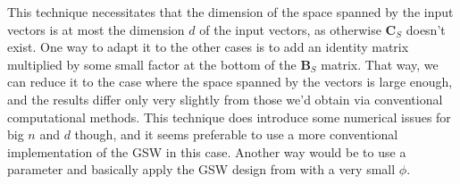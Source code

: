 \documentclass[12pt]{article}
\begin{document}
This technique necessitates that the dimension of the space spanned by the input vectors is at most the dimension $d$ of the input vectors, as otherwise $\textbf{C}_S$ doesn't exist. One way to adapt it to the other cases is to add an identity matrix multiplied by some small factor at the bottom of the $\textbf{B}_S$ matrix. That way, we can reduce it to the case where the space spanned by the vectors is large enough, and the results differ only very slightly from those we'd obtain via conventional computational methods. This technique does introduce some numerical issues for big $n$ and $d$ though, and it seems preferable to use a more conventional implementation of the GSW in this case. Another way would be to use a parameter and basically apply the GSW design from\cite{harshaw2019balancing} with a very small $\phi$.
\end{document}
